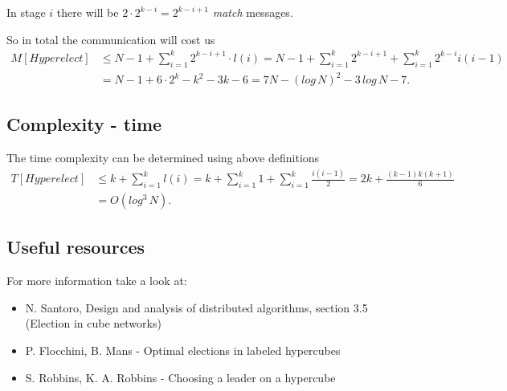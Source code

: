 \documentclass[11pt]{article}
\begin{document}
In stage $i$ there will be $2\cdot 2^{k-i} = 2^{k-i+1}$ \textit{match} messages.

So in total the communication will cost us
\begin{align*}
    M[Hyperelect] &\leq N-1 + \sum_{i=1}^{k}2^{k-i+1}\cdot l(i) 
    = N-1 + \sum_{i=1}^{k}2^{k-i+1} + \sum_{i=1}^{k}2^{k-i}i(i-1)\\
    &= N-1 + 6\cdot 2^{k}-k^{2}-3k-6 = 7N - (log\,N)^{2} - 3\,log\,N-7.
\end{align*}

\subsection*{Complexity - time}

The time complexity can be determined using above definitions
\begin{align*}
    T[Hyperelect] &\leq k + \sum_{i=1}^{k}l(i) 
    = k + \sum_{i=1}^{k}1+\sum_{i=1}^{k}\frac{i(i-1)}{2} 
    = 2k + \frac{(k-1)k(k+1)}{6} \\
    &= O(log^{3}\,N).
\end{align*}

\subsection*{Useful resources}
For more information take a look at:
\begin{itemize}
    \item N. Santoro, Design and analysis of distributed algorithms, section 3.5 (Election in cube networks)
    \item P. Flocchini, B. Mans - Optimal elections in labeled hypercubes
    \item S. Robbins, K. A. Robbins - Choosing a leader on a hypercube
\end{itemize}
\end{document}
